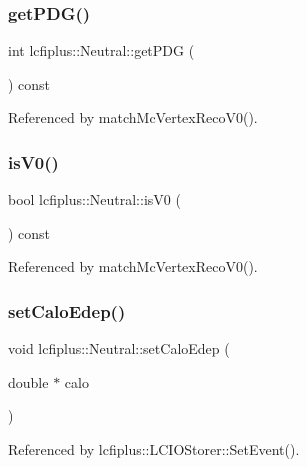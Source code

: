 \subsubsection{get\+P\+D\+G()}
{\footnotesize\ttfamily int lcfiplus\+::\+Neutral\+::get\+P\+DG (\begin{DoxyParamCaption}{ }\end{DoxyParamCaption}) const\hspace{0.3cm}{\ttfamily [inline]}}



Referenced by match\+Mc\+Vertex\+Reco\+V0().

\mbox{\label{classlcfiplus_1_1Neutral_a09afe4c37b2bf67c4891d6f174bf3af3}} 
\subsubsection{is\+V0()}
{\footnotesize\ttfamily bool lcfiplus\+::\+Neutral\+::is\+V0 (\begin{DoxyParamCaption}{ }\end{DoxyParamCaption}) const\hspace{0.3cm}{\ttfamily [inline]}}



Referenced by match\+Mc\+Vertex\+Reco\+V0().

\mbox{\label{classlcfiplus_1_1Neutral_ad79a7bed2aacd6574edf0e30fc1c7aab}} 
\subsubsection{set\+Calo\+Edep()}
{\footnotesize\ttfamily void lcfiplus\+::\+Neutral\+::set\+Calo\+Edep (\begin{DoxyParamCaption}\item[{double $\ast$}]{calo }\end{DoxyParamCaption})\hspace{0.3cm}{\ttfamily [inline]}}



Referenced by lcfiplus\+::\+L\+C\+I\+O\+Storer\+::\+Set\+Event().

\mbox{\label{classlcfiplus_1_1Neutral_aaf7c7d4cafdb20ac9593d06c401c9023}} 
